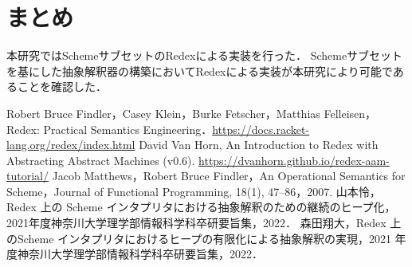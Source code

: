 \documentclass[twocolumn]{jsarticle}
\begin{document}
\section{まとめ}
本研究ではSchemeサブセットのRedexによる実装を行った．
Schemeサブセットを基にした抽象解釈器の構築においてRedexによる実装が本研究により可能であることを確認した．
\begin{thebibliography}{99}
Robert Bruce Findler，Casey Klein，Burke Fetscher，Matthias Felleisen，Redex: Practical Semantics Engineering．\url{https://docs.racket-lang.org/redex/index.html}
David Van Horn, An Introduction to Redex with Abstracting Abstract Machines (v0.6). \url{https://dvanhorn.github.io/redex-aam-tutorial/}
Jacob Matthews，Robert Bruce Findler，An Operational Semantics for Scheme，Journal of Functional Programming, 18(1), 47--86，2007.
山本怜，Redex 上の Scheme インタプリタにおける抽象解釈のための継続のヒープ化，2021年度神奈川大学理学部情報科学科卒研要旨集，2022．
森田翔大，Redex 上のScheme インタプリタにおけるヒープの有限化による抽象解釈の実現，2021 年度神奈川大学理学部情報科学科卒研要旨集，2022．
\end{thebibliography}
\end{document}
